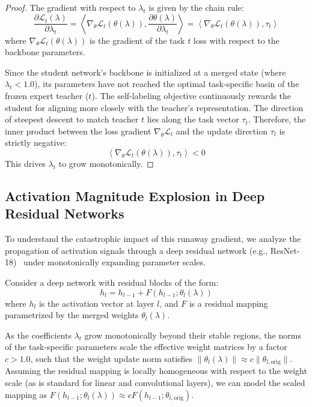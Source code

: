 \documentclass{article}
\theoremstyle{plain}
\theoremstyle{definition}
\theoremstyle{remark}
\begin{document}
\begin{proof}
  The gradient with respect to $\lambda_t$ is given by the chain rule:
  \begin{equation}
    \frac{\partial \mathcal{L}_t(\lambda)}{\partial \lambda_t} = \left\langle \nabla_{\theta} \mathcal{L}_t(\theta(\lambda)), \frac{\partial \theta(\lambda)}{\partial \lambda_t} \right\rangle = \left\langle \nabla_{\theta} \mathcal{L}_t(\theta(\lambda)), \tau_t \right\rangle
  \end{equation}  where $\nabla_{\theta} \mathcal{L}_t(\theta(\lambda))$ is the gradient of the task $t$ loss with respect to the backbone parameters.
  
  Since the student network's backbone is initialized at a merged state (where $\lambda_t < 1.0$), its parameters have not reached the optimal task-specific basin of the frozen expert teacher ($t$). The self-labeling objective continuously rewards the student for aligning more closely with the teacher's representation. The direction of steepest descent to match teacher $t$ lies along the task vector $\tau_t$. Therefore, the inner product between the loss gradient $\nabla_{\theta} \mathcal{L}_t$ and the update direction $\tau_t$ is strictly negative:
  \begin{equation}
    \left\langle \nabla_{\theta} \mathcal{L}_t(\theta(\lambda)), \tau_t \right\rangle < 0
  \end{equation}
  This drives $\lambda_t$ to grow monotonically.
\end{proof}

\subsection{Activation Magnitude Explosion in Deep Residual Networks}
To understand the catastrophic impact of this runaway gradient, we analyze the propagation of activation signals through a deep residual network (e.g., ResNet-18)~\cite{he2016deep} under monotonically expanding parameter scales.

Consider a deep network with residual blocks of the form:
\begin{equation}
  h_{l} = h_{l-1} + F(h_{l-1}; \theta_l(\lambda))
\end{equation}
where $h_l$ is the activation vector at layer $l$, and $F$ is a residual mapping parametrized by the merged weights $\theta_l(\lambda)$. 

As the coefficients $\lambda_t$ grow monotonically beyond their stable regions, the norms of the task-specific parameters scale the effective weight matrices by a factor $c > 1.0$, such that the weight update norm satisfies $\|\theta_l(\lambda)\| \approx c \|\theta_{l, \text{orig}}\|$. Assuming the residual mapping is locally homogeneous with respect to the weight scale (as is standard for linear and convolutional layers), we can model the scaled mapping as $F(h_{l-1}; \theta_l(\lambda)) \approx c F(h_{l-1}; \theta_{l, \text{orig}})$.
\end{document}

